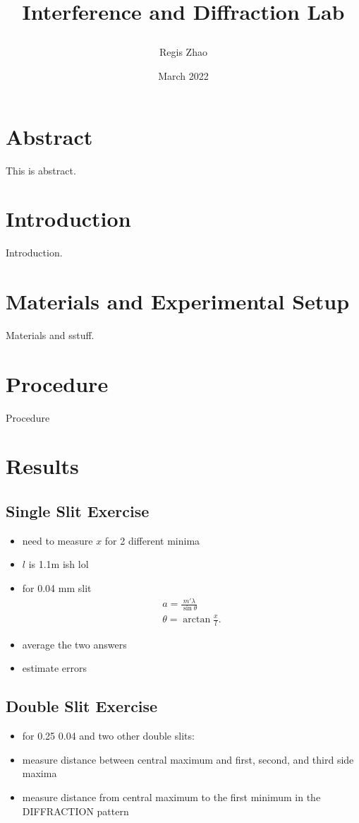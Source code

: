 \documentclass[12pt,twocolumn,letterpaper]{article}
\title{
\usefont{OT1}{bch}{b}{n}

\huge Interference and Diffraction Lab\\
}
\author[2]{Regis Zhao}
\date{March 2022}
\begin{document}
\begin{strip} %
\maketitle
\tableofcontents
\end{strip}


\section{Abstract}
This is abstract.

\section{Introduction}
Introduction.

\section{Materials and Experimental Setup}
Materials and sstuff.

\section{Procedure}
Procedure


\section{Results}

\subsection{Single Slit Exercise}
\begin{itemize}
    \item need to measure $x$ for 2 different minima
    \item $l$ is 1.1m ish lol
    \item for 0.04 mm slit
        \begin{gather}
            a = \frac{m'\lambda}{\sin \theta} \\ 
            \theta = \arctan \frac{x}{l}
        .\end{gather}
    \item average the two answers
    \item estimate errors
\end{itemize}

\subsection{Double Slit Exercise}
\begin{itemize}
    \item for 0.25 0.04 and two other double slits:
    \item measure distance between central maximum and first, second, and third side maxima
    \item measure distance from central maximum to the first minimum in the DIFFRACTION pattern
\end{itemize}
\end{document}
